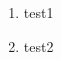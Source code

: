\documentclass{beamer}
\begin{document}
    \begin{frame}
        \begin{enumerate}
            \item<2-> test1
            \item<3-> test2
        \end{enumerate}
    \end{frame}
\end{document}
